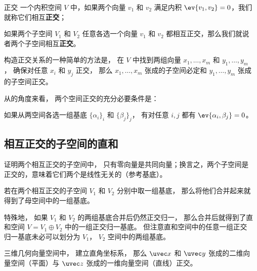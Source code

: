 
\begin{issues}
\issueTODO
\end{issues}



\begin{definition}{正交}
一个内积空间 $V$ 中，如果两个向量 ${v_1}$ 和 ${v_2}$ 满足内积 $\ev{v_1, v_2} = 0$，我们就称它们相互\textbf{正交}；

如果两个子空间 $V_1$ 和 $V_2$ 任意各选一个向量 ${v_1}$ 和 ${v_2}$ 都相互正交，那么我们就说者两个子空间相互\textbf{正交}。
\end{definition}

构造正交关系的一种简单的方法是， 在 $V$ 中找到两组向量 $x_1, \dots, x_m$ 和 $y_1, \dots, y_m$， 确保对任意 $x_i$ 和 $y_j$ 正交， 那么 $x_1, \dots, x_m$ 张成的子空间必定和 $y_1, \dots, y_m$ 张成的子空间正交。

从的角度来看， 两个空间正交的充分必要条件是：
\begin{theorem}{}
如果从两空间各选一组基底 $\{\alpha_i\}_i$ 和 $\{\beta_j\}_j$， 有对任意 $i, j$ 都有 $\ev{\alpha_i, \beta_j} = 0$。
\end{theorem}

\subsection{相互正交的子空间的直和}

\begin{exercise}{}
证明两个相互正交的子空间中， 只有零向量是共同向量；换言之，两个子空间是正交的，意味着它们两个是线性无关的（参考基底）。
\end{exercise}

若在两个相互正交的子空间 $V_1$ 和 $V_2$ 分别中取一组基底， 那么将他们合并起来就得到了母空间中的一组基底。

特殊地， 如果 $V_1$ 和 $V_2$ 的两组基底合并后仍然正交归一， 那么合并后就得到了直和空间 $V = V_1 \oplus V_2$ 中的一组正交归一基底。 但注意直和空间中的任意一组正交归一基底未必可以划分为 $V_1$， $V_2$ 空间中的两组基底。

\begin{example}{}
三维几何向量空间中， 建立直角坐标系， 那么 $\uvec x$ 和 $\uvec y$ 张成的二维向量空间（平面）与 $\uvec z$ 张成的一维向量空间（直线）正交。
\end{example}

